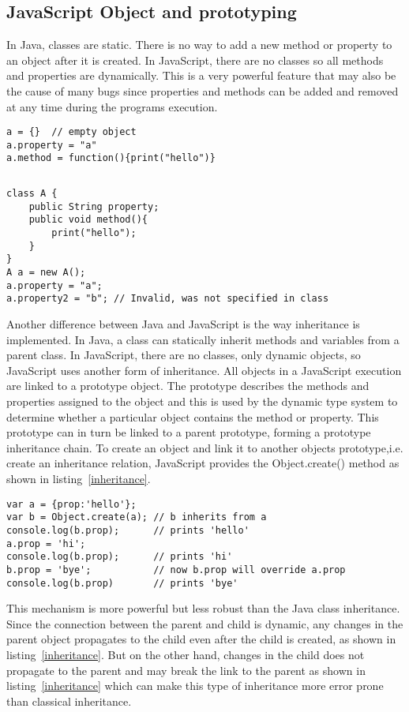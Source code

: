 \subsection{JavaScript Object and prototyping}
In Java, classes are static. There is no way to add a new method or property to an object after it is created. In JavaScript, there are no classes so all methods and properties are dynamically. This is a very powerful feature that may also be the cause of many bugs since properties and methods can be added and removed at any time during the programs execution.

\begin{lstlisting}[caption=JavaScript]
a = {} 	// empty object
a.property = "a"
a.method = function(){print("hello")}
\end{lstlisting}	

\begin{verbatim}

\end{verbatim}

\begin{lstlisting}[caption=Java]
class A {
	public String property;
	public void method(){
		print("hello");
	}
}
A a = new A();
a.property = "a";
a.property2 = "b"; // Invalid, was not specified in class
\end{lstlisting}
Another difference between Java and JavaScript is the way inheritance is implemented. In Java, a class can statically inherit methods and variables from a parent class. In JavaScript, there are no classes, only dynamic objects, so JavaScript uses another form of inheritance. All objects in a JavaScript execution are linked to a prototype object. The prototype describes the methods and properties assigned to the object and this is used by the dynamic type system to determine whether a particular object contains the method or property. This prototype can in turn be linked to a parent prototype, forming a prototype inheritance chain. To create an object and link it to another objects prototype,i.e. create an inheritance relation, JavaScript provides the Object.create() method as shown in listing~\ref{inheritance}.

\begin{lstlisting}[caption=Inheritance,label=inheritance]
var a = {prop:'hello'};
var b = Object.create(a); // b inherits from a
console.log(b.prop);      // prints 'hello'
a.prop = 'hi';
console.log(b.prop);      // prints 'hi'
b.prop = 'bye';           // now b.prop will override a.prop
console.log(b.prop)       // prints 'bye'
\end{lstlisting}	
This mechanism is more powerful but less robust than the Java class inheritance. Since the connection between the parent and child is dynamic, any changes in the parent object propagates to the child even after the child is created, as shown in listing~\ref{inheritance}. But on the other hand, changes in the child does not propagate to the parent and may break the link to the parent as shown in listing~\ref{inheritance} which can make this type of inheritance more error prone than classical inheritance. 


